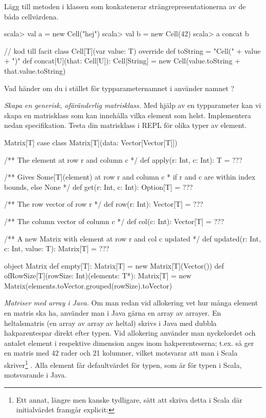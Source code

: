 \Subtask Lägg till metoden  i klassen  som konkatenerar strängrepresentationerna av de båda cellvärdena.

\begin{REPL}
scala> val a = new Cell("hej")
scala> val b = new Cell(42)
scala> a concat b
\end{REPL}

\begin{Code}
// kod till facit
class Cell[T](var value: T){
  override def toString = "Cell(" + value + ")"
  def concat[U](that: Cell[U]): Cell[String] = 
    new Cell(value.toString + that.value.toString)
}
\end{Code}

\Subtask\Pen Vad händer om du i stället för typparameternamnet  i  använder namnet ?

\Task \emph{Skapa en generisk, ofäränderlig matrisklass.} Med hjälp av en typparameter kan vi skapa en matrisklass som kan innehålla vilka element som helst. Implementera nedan specifikation. Testa din matrisklass i REPL för olika typer av element.

\begin{ScalaSpec}{Matrix[T]}
case class Matrix[T](data: Vector[Vector[T]]) {

  /** The element at row r and column c */
  def apply(r: Int, c: Int): T = ???

  /** Gives Some[T](element) at row r and column c 
   *  if r and c are within index bounds, else None */
  def get(r: Int, c: Int): Option[T] = ???

  /** The row vector of row r */ 
  def row(r: Int): Vector[T] = ???

  /** The column vector of column c */ 
  def col(c: Int): Vector[T] = ???

  /** A new Matrix with element at row r and col c updated */
  def updated(r: Int, c: Int, value: T): Matrix[T] = ???
}
object Matrix {
  def empty[T]: Matrix[T] = new Matrix[T](Vector())
  def ofRowSize[T](rowSize: Int)(elements: T*): Matrix[T] =
    new Matrix(elements.toVector.grouped(rowSize).toVector)
}
\end{ScalaSpec}


\Task \label{task:arraymatrix-java} \emph{Matriser med array i Java.} Om man redan vid allokering vet hur många element en matris ska ha, använder man i Java gärna en array av arrayer. En heltalsmatris (en array av array av heltal) skrivs i Java med dubbla hakparentespar  direkt efter typen. Vid allokering använder man nyckelordet  och antalet element i respektive dimension anges inom hakperenteserna; t.ex. så ger  en matris med 42 rader och 21 kolumner, vilket motsvarar att man i Scala skriver\footnote{Ett annat, längre men kanske tydligare, sätt att skriva detta i Scala där initialvärdet framgår explicit: }  . Alla element får defaultvärdet för typen, som är  för typen  i Scala, motsvarande  i Java.

